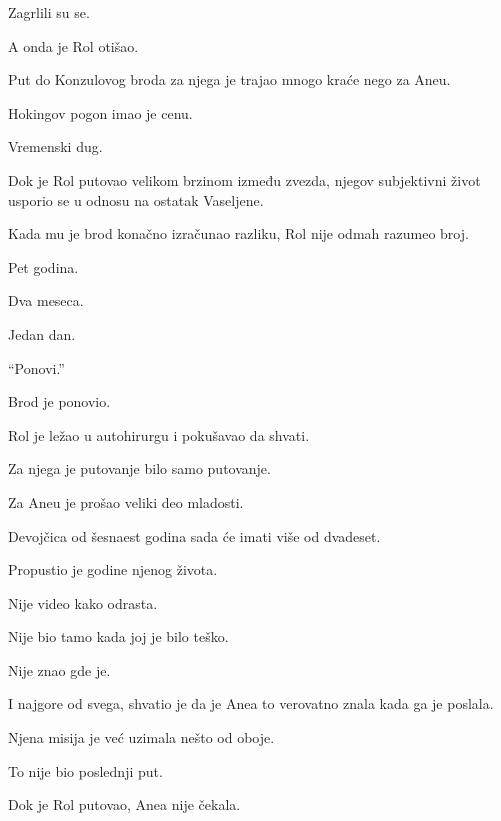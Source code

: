Zagrlili su se.

\bigskip

A onda je Rol otišao.

\bigskip

Put do Konzulovog broda za njega je trajao mnogo kraće nego za Aneu.

\bigskip

Hokingov pogon imao je cenu.

Vremenski dug.

\bigskip

Dok je Rol putovao velikom brzinom između zvezda, njegov subjektivni život usporio se u odnosu na ostatak Vaseljene.

\bigskip

Kada mu je brod konačno izračunao razliku, Rol nije odmah razumeo broj.

\bigskip

Pet godina.

Dva meseca.

Jedan dan.

\bigskip

``Ponovi.''

Brod je ponovio.

\bigskip

Rol je ležao u autohirurgu i pokušavao da shvati.

Za njega je putovanje bilo samo putovanje.

Za Aneu je prošao veliki deo mladosti.

\bigskip

Devojčica od šesnaest godina sada će imati više od dvadeset.

\bigskip

Propustio je godine njenog života.

\bigskip

Nije video kako odrasta.

Nije bio tamo kada joj je bilo teško.

Nije znao gde je.

\bigskip

I najgore od svega, shvatio je da je Anea to verovatno znala kada ga je poslala.

\bigskip

Njena misija je već uzimala nešto od oboje.

\bigskip

To nije bio poslednji put.

\bigskip

Dok je Rol putovao, Anea nije čekala.

